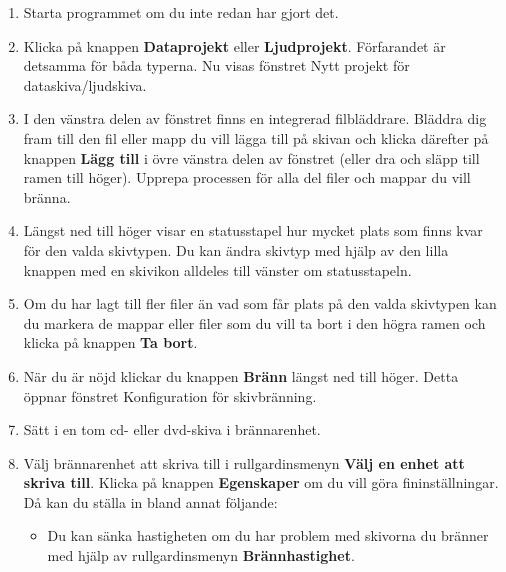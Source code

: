 \documentclass[a4paper,final]{memoir} %
\begin{document}
\begin{enumerate}

\item Starta programmet om du inte redan har gjort det. 

\item Klicka på knappen \textbf{Dataprojekt} eller \textbf{Ljudprojekt}. Förfarandet är detsamma för båda typerna. Nu visas fönstret Nytt projekt för dataskiva/ljudskiva.

\item I den vänstra delen av fönstret finns en integrerad filbläddrare. Bläddra dig fram till den fil eller mapp du vill lägga till på skivan och klicka därefter på knappen \textbf{Lägg till} i övre vänstra delen av fönstret (eller dra och släpp till ramen till höger). Upprepa processen för alla del filer och mappar du vill bränna.

\item Längst ned till höger visar en statusstapel hur mycket plats som finns kvar för den valda skivtypen. Du kan ändra skivtyp med hjälp av den lilla knappen med en skivikon alldeles till vänster om statusstapeln. 

\item Om du har lagt till fler filer än vad som får plats på den valda skivtypen kan du markera de mappar eller filer som du vill ta bort i den högra ramen och klicka på knappen \textbf{Ta bort}.

\item När du är nöjd klickar du knappen \textbf{Bränn} längst ned till höger. Detta öppnar fönstret Konfiguration för skivbränning. 


\item Sätt i en tom cd- eller dvd-skiva i brännarenhet.

\item Välj brännarenhet att skriva till i rullgardinsmenyn \textbf{Välj en enhet att skriva till}. Klicka på knappen \textbf{Egenskaper} om du vill göra fininställningar. Då kan du ställa in bland annat följande:

\begin{itemize}

\item Du kan sänka hastigheten om du har problem med skivorna du bränner med hjälp av rullgardinsmenyn \textbf{Brännhastighet}.


\end{itemize}
\end{enumerate}
\end{document}
